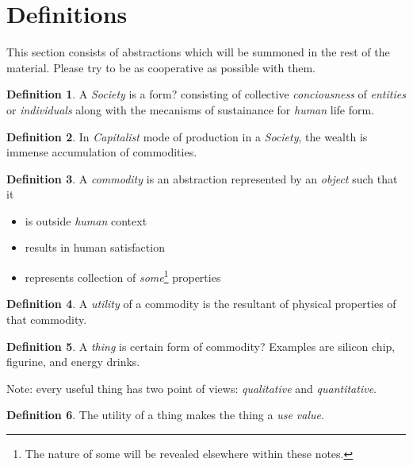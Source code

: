 \documentclass[12pt]{extarticle}
\theoremstyle{definition}
\newtheorem{definition}{Definition}[section]
\begin{document}
\section{Definitions}
This section consists of abstractions which will be summoned in the rest of the material.  Please try to be as cooperative as possible with them.

\begin{definition}
  A \emph{Society} is a form? consisting of collective \emph{conciousness} of \emph{entities} or \emph{individuals} along with the mecanisms of sustainance for \emph{human} life form.  
  \end{definition}

\begin{definition}
  In \emph{Capitalist} mode of production in a \emph{Society}, the wealth is immense accumulation of commodities.
\end{definition}

\begin{definition}
  \label{def:commodity}
  A \emph{commodity} is an abstraction represented by an \emph{object} such that it
  \begin{itemize}
  \item is outside \emph{human} context
  \item results in human satisfaction
  \item represents collection of \emph{some}\footnote{The nature of some will be revealed elsewhere within these notes.} properties
  \end{itemize} 
\end{definition}

\begin{definition}
  A \emph{utility} of a commodity is the resultant of physical properties of that commodity.
\end{definition}

\begin{definition}
 \label{def:thing}
  A \emph{thing} is certain form of commodity?  Examples are silicon chip, figurine, and energy drinks.
\end{definition}
Note: every useful thing has two point of views: \emph{qualitative} and \emph{quantitative}.

\begin{definition}
  \label{def:usevalue}
  The utility of a thing makes the thing a \emph{use value}.
  \end{definition}
\end{document}
